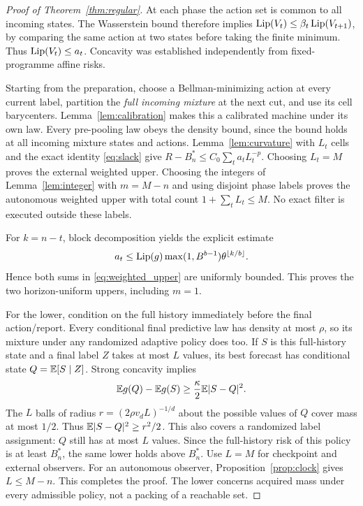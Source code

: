 \begin{proof}[Proof of Theorem~\ref{thm:regular}]
At each phase the action set is common to all incoming states. The Wasserstein bound therefore implies
$\operatorname{Lip}(V_t)\le\beta_t\operatorname{Lip}(V_{t+1})$, by comparing the same action at two states before taking the finite minimum. Thus $\operatorname{Lip}(V_t)\le a_t$. Concavity was established independently from fixed-programme affine risks.

Starting from the preparation, choose a Bellman-minimizing action at every current label, partition the \emph{full incoming mixture} at the next cut, and use its cell barycenters. Lemma~\ref{lem:calibration} makes this a calibrated machine under its own law. Every pre-pooling law obeys the density bound, since the bound holds at all incoming mixture states and actions. Lemma~\ref{lem:curvature} with $L_t$ cells and the exact identity \eqref{eq:slack} give
$R-B_n^*\le C_0\sum_ta_t L_t^{-p}$. Choosing $L_t=M$ proves the external weighted upper. Choosing the integers of Lemma~\ref{lem:integer} with $m=M-n$ and using disjoint phase labels proves the autonomous weighted upper with total count $1+\sum_tL_t\le M$. No exact filter is executed outside these labels.

For $k=n-t$, block decomposition yields the explicit estimate
\[
 a_t\le\operatorname{Lip}(g)\max(1,B^{b-1})\theta^{\lfloor k/b\rfloor}.
\]
Hence both sums in \eqref{eq:weighted_upper} are uniformly bounded. This proves the two horizon-uniform uppers, including $m=1$.

For the lower, condition on the full history immediately before the final action/report. Every conditional final predictive law has density at most $\rho$, so its mixture under any randomized adaptive policy does too. If $S$ is this full-history state and a final label $Z$ takes at most $L$ values, its best forecast has conditional state $Q=\mathbb E[S\mid Z]$. Strong concavity implies
\[
 \mathbb E g(Q)-\mathbb E g(S)\ge\frac{\kappa}{2}\mathbb E|S-Q|^2.
\]
The $L$ balls of radius $r=(2\rho v_dL)^{-1/d}$ about the possible values of $Q$ cover mass at most $1/2$. Thus $\mathbb E|S-Q|^2\ge r^2/2$. This also covers a randomized label assignment: $Q$ still has at most $L$ values. Since the full-history risk of this policy is at least $B_n^*$, the same lower holds above $B_n^*$. Use $L=M$ for checkpoint and external observers. For an autonomous observer, Proposition~\ref{prop:clock} gives $L\le M-n$. This completes the proof. The lower concerns acquired mass under every admissible policy, not a packing of a reachable set.
\end{proof}


